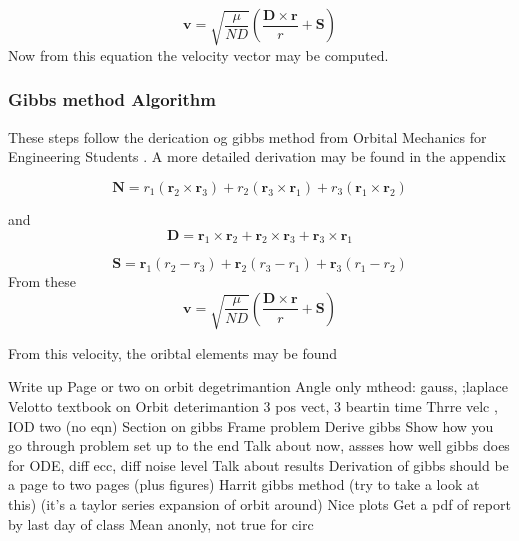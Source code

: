 \documentclass[12pt]{article}
\begin{document}
	\begin{equation}
	\mathbf { v } = \sqrt { \frac { \mu } { N D } } \left( \frac { \mathbf { D } \times \mathbf { r } } { r } + \mathbf { S } \right)
	\end{equation}
	 Now from this equation the velocity vector may be computed. 
	\iffalse
	\subsubsection{Gibbs method Algorithm}
	These steps follow the derication og gibbs method from Orbital Mechanics for Engineering Students \cite{curtis2013_gibbs}. A more detailed derivation may be found in the appendix
	
	\begin{equation}
	\mathbf { N } = r _ { 1 } \left( \mathbf { r } _ { 2 } \times \mathbf { r } _ { 3 } \right) + r _ { 2 } \left( \mathbf { r } _ { 3 } \times \mathbf { r } _ { 1 } \right) + r _ { 3 } \left( \mathbf { r } _ { 1 } \times \mathbf { r } _ { 2 } \right)
	\end{equation}
	
	and
	\begin{equation}
	\mathbf { D } = \mathbf { r } _ { 1 } \times \mathbf { r } _ { 2 } + \mathbf { r } _ { 2 } \times \mathbf { r } _ { 3 } + \mathbf { r } _ { 3 } \times \mathbf { r } _ { 1 }
	\end{equation}
	
	\begin{equation}
	\mathbf { S } = \mathbf { r } _ { 1 } \left( r _ { 2 } - r _ { 3 } \right) + \mathbf { r } _ { 2 } \left( r _ { 3 } - r _ { 1 } \right) + \mathbf { r } _ { 3 } \left( r _ { 1 } - r _ { 2 } \right)
	\end{equation}
	From these
	\begin{equation}
	\mathbf { v } = \sqrt { \frac { \mu } { N D } } \left( \frac { \mathbf { D } \times \mathbf { r } } { r } + \mathbf { S } \right)
	\end{equation}
	
	From this velocity, the oribtal elements may be found
	
	
	Write up
	Page or two on orbit degetrimantion
	Angle only mtheod: gauss, ;laplace
	Velotto textbook on Orbit deterimantion
	3 pos vect, 3 beartin time
	Thrre velc , IOD two
	(no eqn)
	Section on gibbs
	Frame problem
	Derive gibbs
	Show how you go through problem set up to the end
	Talk about now, assses how well gibbs does for ODE, diff ecc, diff noise level
	Talk about results
	Derivation of gibbs should be a page to two pages (plus figures)
	Harrit gibbs method (try to take a look at this) (it’s a taylor series expansion of orbit around)
	Nice plots
	Get a pdf of report by last day of class
	Mean  anonly, not true for circ
	
\end{document}
